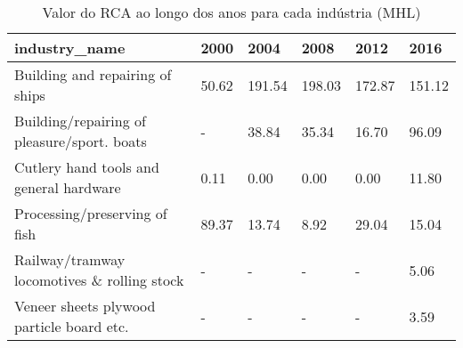 \begin{table}
\centering
\caption{Valor do RCA ao longo dos anos para cada indústria (MHL)}
\begin{tabular}{p{6cm}p{1.5cm}p{1.5cm}p{1.5cm}p{1.5cm}p{1.5cm}}
\toprule
                              industry\_name &  2000 &   2004 &   2008 &   2012 &   2016 \\
\midrule
            Building and repairing of ships & 50.62 & 191.54 & 198.03 & 172.87 & 151.12 \\
Building/repairing of pleasure/sport. boats &     - &  38.84 &  35.34 &  16.70 &  96.09 \\
    Cutlery hand tools and general hardware &  0.11 &   0.00 &   0.00 &   0.00 &  11.80 \\
              Processing/preserving of fish & 89.37 &  13.74 &   8.92 &  29.04 &  15.04 \\
Railway/tramway locomotives \& rolling stock &     - &      - &      - &      - &   5.06 \\
  Veneer sheets plywood particle board etc. &     - &      - &      - &      - &   3.59 \\
\bottomrule
\end{tabular}
\end{table}
